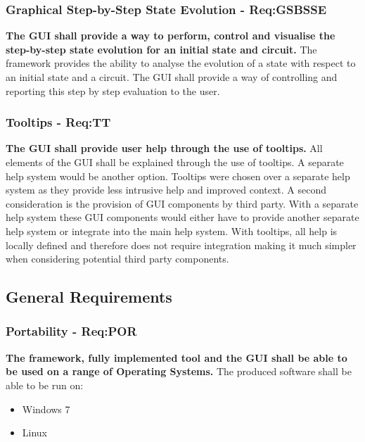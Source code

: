 \subsubsection{Graphical Step-by-Step State Evolution - Req:GSBSSE}
\label{sec:reqgsbsse}
\textbf{The GUI shall provide a way to perform, control and visualise the step-by-step state evolution for an initial state and circuit.}
The framework provides the ability to analyse the evolution of a state with respect to an initial state and a circuit.
The GUI shall provide a way of controlling and reporting this step by step evaluation to the user.

\subsubsection{Tooltips - Req:TT}
\label{sec:reqtt}
\textbf{The GUI shall provide user help through the use of tooltips.}
All elements of the GUI shall be explained through the use of tooltips.
A separate help system would be another option.
Tooltips were chosen over a separate help system as they provide less intrusive help and improved context.
A second consideration is the provision of GUI components by third party.
With a separate help system these GUI components would either have to provide another separate help system or integrate into the main help system.
With tooltips, all help is locally defined and therefore does not require integration making it much simpler when considering potential third party components.

\subsection{General Requirements}
\subsubsection{Portability - Req:POR}
\label{sec:reqpor}
\textbf{The framework, fully implemented tool and the GUI shall be able to be used on a range of Operating Systems.}
The produced software shall be able to be run on:
\begin{itemize}
 \item Windows 7
 \item Linux
\end{itemize}
% 
